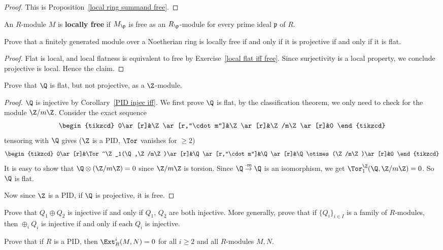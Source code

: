 \begin{proof}
This is Proposition~\ref{local ring summand free}.
\end{proof}
\begin{exercise}
An $R$-module $M$ is \textbf{locally free} if $M_\p$ is free as an $R_{\p}$-module for every prime ideal $\mathfrak{p}$ of $R$.\par
Prove that a finitely generated module over a Noetherian ring is locally free if and only if it is projective if and only if it is flat.
\end{exercise}
\begin{proof}
Flat is local, and local flatness is equivalent to free by Exercise~\ref{local flat iff free}. Since surjectivity is a local property, we conclude projective is local. Hence the claim. 
\end{proof}
\begin{exercise}
Prove that $\Q$ is flat, but not projective, as a $\Z$-module.
\end{exercise}
\begin{proof}
$\Q$ is injective by Corollary~\ref{PID injec iff}. We first prove $\Q$ is flat, by the classification theorem, we only need to check for the module $\Z/m\Z$. Consider the exact sequence
\[\begin{tikzcd}
0\ar[r]&\Z\ar[r,"\cdot m"]&\Z\ar[r]&\Z/m\Z\ar[r]&0
\end{tikzcd}\]
tensoring with $\Q$ gives ($\Z$ is a PID, $\Tor$ vanishes for $\geqslant 2$)
\[\begin{tikzcd}
0\ar[r]&\Tor^\Z_1(\Q,\Z/m\Z)\ar[r]&\Q\ar[r,"\cdot m"]&\Q\ar[r]&\Q\otimes(\Z/m\Z)\ar[r]&0
\end{tikzcd}\]
It is easy to show that $\Q\otimes(\Z/m\Z)=0$ since $\Z/m\Z$ is torsion. Since $\Q\stackrel{\cdot m}{\to}\Q$ is an isomorphism, we get $\Tor_1^\Z(\Q,\Z/m\Z)=0$. So $\Q$ is flat.\par
Now since $\Z$ is a PID, if $\Q$ is projective, it is free.
\end{proof}
\begin{exercise}
Prove that $Q_1\oplus Q_2$ is injective if and only if $Q_1$, $Q_2$ are both injective. More
generally, prove that if $\{Q_i\}_{i\in I}$ is a family of $R$-modules, then $\oplus_iQ_i$ is injective if and only if each $Q_i$ is injective.
\end{exercise}
\begin{exercise}
Prove that if $R$ is a PID, then $\Ext^i_R(M,N)=0$ for all $i\geqslant2$ and all $R$-modules $M,N$.
\end{exercise}
